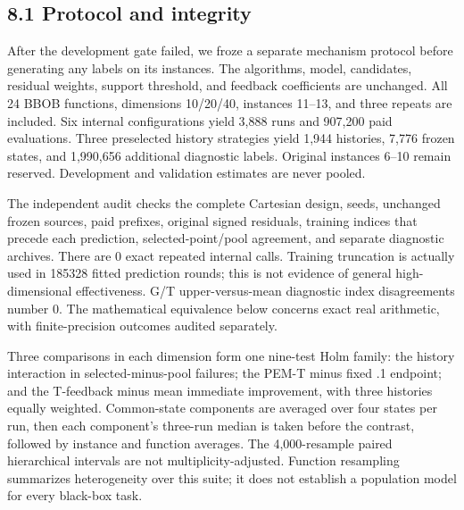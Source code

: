 \documentclass[11pt,a4paper]{article}
\begin{document}
\hypertarget{protocol-and-integrity}{%
\subsection{8.1 Protocol and integrity}\label{protocol-and-integrity}}

After the development gate failed, we froze a separate mechanism
protocol before generating any labels on its instances. The algorithms,
model, candidates, residual weights, support threshold, and feedback
coefficients are unchanged. All 24 BBOB functions, dimensions 10/20/40,
instances 11--13, and three repeats are included. Six internal
configurations yield 3,888 runs and 907,200 paid evaluations. Three
preselected history strategies yield 1,944 histories, 7,776 frozen
states, and 1,990,656 additional diagnostic labels. Original instances
6--10 remain reserved. Development and validation estimates are never
pooled.

The independent audit checks the complete Cartesian design, seeds,
unchanged frozen sources, paid prefixes, original signed residuals,
training indices that precede each prediction, selected-point/pool
agreement, and separate diagnostic archives. There are 0 exact repeated
internal calls. Training truncation is actually used in 185328 fitted
prediction rounds; this is not evidence of general high-dimensional
effectiveness. G/T upper-versus-mean diagnostic index disagreements
number 0. The mathematical equivalence below concerns exact real
arithmetic, with finite-precision outcomes audited separately.

Three comparisons in each dimension form one nine-test Holm family: the
history interaction in selected-minus-pool failures; the PEM-T minus
fixed .1 endpoint; and the T-feedback minus mean immediate improvement,
with three histories equally weighted. Common-state components are
averaged over four states per run, then each component's three-run
median is taken before the contrast, followed by instance and function
averages. The 4,000-resample paired hierarchical intervals are not
multiplicity-adjusted. Function resampling summarizes heterogeneity over
this suite; it does not establish a population model for every black-box
task.
\end{document}
